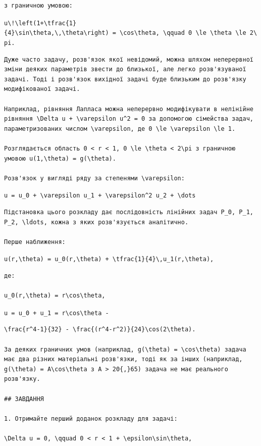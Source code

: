 \documentclass[
  ukrainian,
]{article}
\begin{document}
\begin{verbatim}
з граничною умовою:
\end{verbatim}

\texttt{u\textbackslash{}!\textbackslash{}left(1+\textbackslash{}tfrac\{1\}\{4\}\textbackslash{}sin\textbackslash{}theta,\textbackslash{},\textbackslash{}theta\textbackslash{}right)\ =\ \textbackslash{}cos\textbackslash{}theta,\ \textbackslash{}qquad\ 0\ \textbackslash{}le\ \textbackslash{}theta\ \textbackslash{}le\ 2\textbackslash{}pi.}

\begin{verbatim}
Дуже часто задачу, розв'язок якої невідомий, можна шляхом неперервної зміни деяких параметрів звести до близької, але легко розв'язуваної задачі. Тоді і розв'язок вихідної задачі буде близьким до розв'язку модифікованої задачі.

Наприклад, рівняння Лапласа можна неперервно модифікувати в нелінійне рівняння \Delta u + \varepsilon u^2 = 0 за допомогою сімейства задач, параметризованих числом \varepsilon, де 0 \le \varepsilon \le 1.

Розглядається область 0 < r < 1, 0 \le \theta < 2\pi з граничною умовою u(1,\theta) = g(\theta).

Розв'язок у вигляді ряду за степенями \varepsilon:
\end{verbatim}

\texttt{u\ =\ u\_0\ +\ \textbackslash{}varepsilon\ u\_1\ +\ \textbackslash{}varepsilon\^{}2\ u\_2\ +\ \textbackslash{}dots}

\begin{verbatim}
Підстановка цього розкладу дає послідовність лінійних задач P_0, P_1, P_2, \ldots, кожна з яких розв'язується аналітично.

Перше наближення:
\end{verbatim}

\texttt{u(r,\textbackslash{}theta)\ =\ u\_0(r,\textbackslash{}theta)\ +\ \textbackslash{}tfrac\{1\}\{4\}\textbackslash{},u\_1(r,\textbackslash{}theta),}

\begin{verbatim}
де:

u_0(r,\theta) = r\cos\theta,
\end{verbatim}

\texttt{u\ =\ \textquotesingle{}u\_0\textquotesingle{}\ +\ u\_1\ =\ r\textbackslash{}cos\textbackslash{}theta\ -}

\begin{verbatim}
\frac{r^4-1}{32} - \frac{(r^4-r^2)}{24}\cos(2\theta).

За деяких граничних умов (наприклад, g(\theta) = \cos\theta) задача має два різних матеріальні розв'язки, тоді як за інших (наприклад, g(\theta) = A\cos\theta з A > 20{,}65) задача не має реального розв'язку.

## ЗАВДАННЯ

1. Отримайте перший доданок розкладу для задачі:

\Delta u = 0, \qquad 0 < r < 1 + \epsilon\sin\theta,
\end{verbatim}
\end{document}
